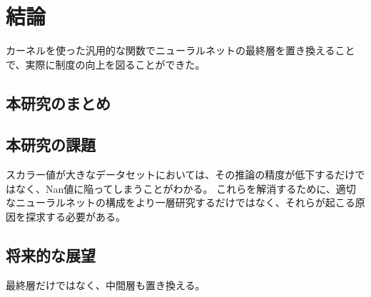 \chapter{結論}
\label{conclusion}

カーネルを使った汎用的な関数でニューラルネットの最終層を置き換えることで、実際に制度の向上を図ることができた。

\section{本研究のまとめ}

\section{本研究の課題}
スカラー値が大きなデータセットにおいては、その推論の精度が低下するだけではなく、Nan値に陥ってしまうことがわかる。
これらを解消するために、適切なニューラルネットの構成をより一層研究するだけではなく、それらが起こる原因を探求する必要がある。



\section{将来的な展望}
最終層だけではなく、中間層も置き換える。

